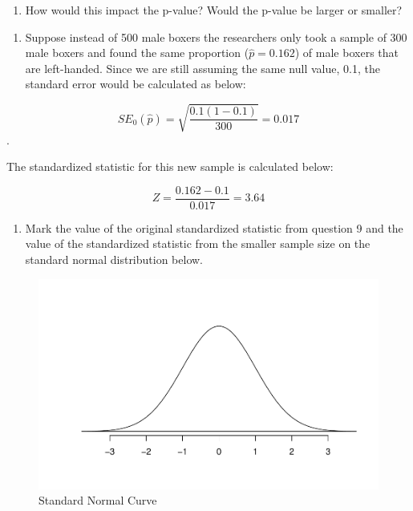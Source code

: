 \documentclass[
]{report}
\providecommand{\tightlist}{%
  \setlength{\itemsep}{0pt}\setlength{\parskip}{0pt}}
\begin{document}
\vspace{0.3in}

\begin{enumerate}
\def\labelenumi{\arabic{enumi}.}
\setcounter{enumi}{13}
\tightlist
\item
  How would this impact the p-value? Would the p-value be larger or smaller?
\end{enumerate}

\vspace{0.2in}

\begin{enumerate}
\def\labelenumi{\arabic{enumi}.}
\setcounter{enumi}{14}
\tightlist
\item
  Suppose instead of 500 male boxers the researchers only took a sample of 300 male boxers and found the same proportion (\(\hat{p}=0.162\)) of male boxers that are left-handed. Since we are still assuming the same null value, 0.1, the standard error would be calculated as below:
\end{enumerate}

\[SE_0(\hat{p})=\sqrt{\frac{0.1(1-0.1)}{300}} = 0.017\].

The standardized statistic for this new sample is calculated below:

\[Z = \frac{0.162-0.1}{0.017} = 3.64\]

\begin{enumerate}
\def\labelenumi{\arabic{enumi}.}
\setcounter{enumi}{15}
\tightlist
\item
  Mark the value of the original standardized statistic from question 9 and the value of the standardized statistic from the smaller sample size on the standard normal distribution below.
\end{enumerate}

\begin{figure}

{\centering \includegraphics[width=0.5\linewidth]{04-A09-inference-1cat-theory_files/figure-latex/Norcur-1} 

}

\caption{Standard Normal Curve}\label{fig:Norcur}
\end{figure}
\end{document}
